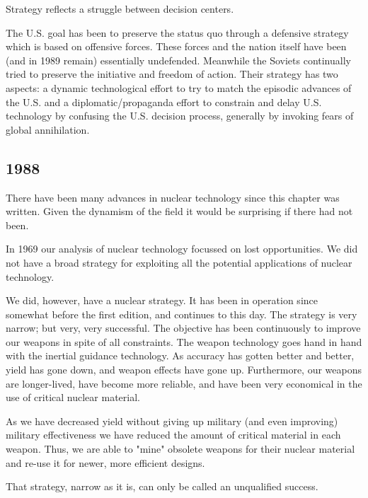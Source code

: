 Strategy reflects a struggle between decision centers.

The U.S. goal has been to preserve the status quo through a defensive strategy which is based on offensive forces. These forces and the nation itself have been (and in 1989 remain) essentially undefended. Meanwhile the Soviets continually tried to preserve the initiative and freedom of action. Their strategy has two aspects: a dynamic technological effort to try to match the episodic advances of the U.S. and a diplomatic/propaganda effort to constrain and delay U.S. technology by confusing the U.S. decision process, generally by invoking fears of global annihilation.

\subsection{1988}
There have been many advances in nuclear technology since this chapter was written. Given the dynamism of the field it would be surprising if there had not been.

In 1969 our analysis of nuclear technology focussed on lost opportunities. We did not have a broad strategy for exploiting all the potential applications of nuclear technology.

We did, however, have a nuclear strategy. It has been in operation since somewhat before the first edition, and continues to this day. The strategy is very narrow; but very, very successful. The objective has been continuously to improve our weapons in spite of all constraints. The weapon technology goes hand in hand with the inertial guidance technology. As accuracy has gotten better and better, yield has gone down, and weapon effects have gone up. Furthermore, our weapons are longer-lived, have become more reliable, and have been very economical in the use of critical nuclear material.

As we have decreased yield without giving up military (and even improving) military effectiveness we have reduced the amount of critical material in each weapon. Thus, we are able to "mine" obsolete weapons for their nuclear material and re-use it for newer, more efficient designs.

That strategy, narrow as it is, can only be called an unqualified success.

